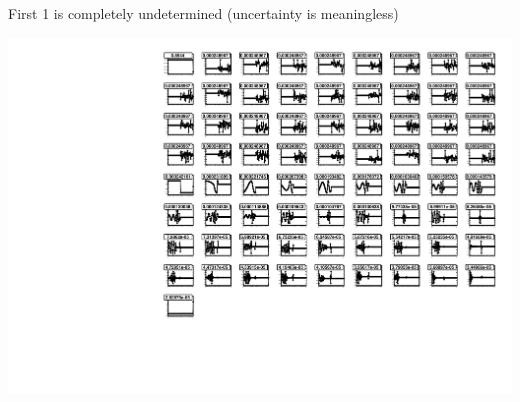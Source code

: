 \documentclass[compress]{beamer}
\begin{document}
\begin{frame}
{First 1 is completely undetermined (uncertainty is meaningless)

\includegraphics[width=0.9\linewidth]{newplots_errors_YEm1_phiz.pdf}}
\end{frame}
\end{document}
